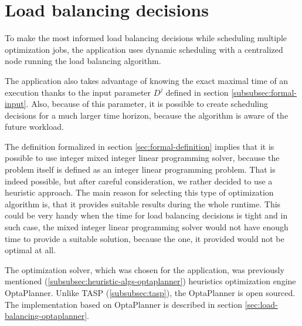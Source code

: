 \section{Load balancing decisions}\label{sec:load-balancing-decisions}

To make the most informed load balancing decisions while scheduling multiple optimization jobs,
the application uses dynamic scheduling with a centralized node running the load balancing algorithm.

The application also takes advantage of knowing the exact maximal time of an execution thanks to the input parameter $D^{j}$ 
defined in section \ref{subsubsec:formal-input}.
Also,
because of this parameter, 
it is possible to create scheduling decisions for a much larger time horizon, 
because the algorithm is aware of the future workload.

The definition formalized in section \ref{sec:formal-definition} implies 
that it is possible to use integer mixed integer linear programming solver, 
because the problem itself is defined as an integer linear programming problem.
That is indeed possible, 
but after careful consideration, we rather decided to use a heuristic approach.
The main reason for selecting this type of optimization algorithm is,
that it provides suitable results during the whole runtime.
This could be very handy when the time for load balancing decisions is tight
and in such case, the mixed integer linear programming solver would not have enough time to provide a suitable solution,
because the one, it provided would not be optimal at all.

The optimization solver, which was chosen for the application,
was previously mentioned (\ref{subsubsec:heuristic-algs-optaplanner}) heuristics optimization engine OptaPlanner.
Unlike TASP (\ref{subsubsec:tasp}), the OptaPlanner is open sourced.
The implementation based on OptaPlanner is described in section \ref{sec:load-balancing-optaplanner}.